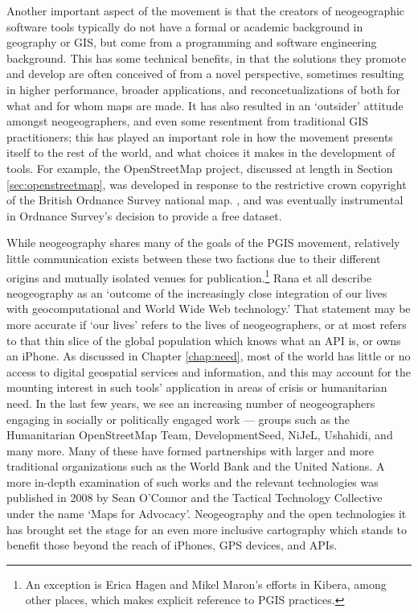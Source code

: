 \documentclass[11pt,oneside,notitlepage]{report}
\begin{document}
{{Another important aspect of the movement is that the creators of neogeographic software tools typically do not have a formal or academic background in geography or GIS, but come from a programming and software engineering background. This has some technical benefits, in that the solutions they promote and develop are often conceived of from a novel perspective, sometimes resulting in higher performance, broader applications, and reconcetualizations of both for what and for whom maps are made. It has also resulted in an `outsider' attitude amongst neogeographers, and even some resentment from traditional GIS practitioners; this has played an important role in how the movement presents itself to the rest of the world, and what choices it makes in the development of tools. For example, the OpenStreetMap project, discussed at length in Section \ref{sec:openstreetmap}, was developed in response to the restrictive crown copyright of the British Ordnance Survey national map. \cite{chilton-crowdsourcing}, and was eventually instrumental in Ordnance Survey's decision to provide a free dataset. \cite{arthur2010ord}

While neogeography shares many of the goals of the \ac{PGIS} movement, relatively little communication exists between these two factions due to their different origins and mutually isolated venues for publication.\footnote{An exception is Erica Hagen and Mikel Maron's efforts in Kibera, among other places, which makes explicit reference to \ac{PGIS} practices.} Rana et all describe neogeography as an `outcome of the increasingly close integration of our lives with geocomputational and World Wide Web technology.' That statement may be more accurate if `our lives' refers to the lives of neogeographers, or at most refers to that thin slice of the global population which knows what an \ac{API} is, or owns an iPhone. As discussed in Chapter \ref{chap:need}, most of the world has little or no access to digital geospatial services and information, and this may account for the mounting interest in such tools' application in areas of crisis or humanitarian need. In the last few years, we see an increasing number of neogeographers engaging in socially or politically engaged work --- groups such as the Humanitarian OpenStreetMap Team, DevelopmentSeed, NiJeL, Ushahidi, and many more. Many of these have formed partnerships with larger and more traditional organizations such as the World Bank and the United Nations. A more in-depth examination of such works and the relevant technologies was published in 2008 by Sean O'Connor and the Tactical Technology Collective under the name `Maps for Advocacy'. \cite{oconnor2008maps} Neogeography and the open technologies it has brought set the stage for an even more inclusive cartography which stands to benefit those beyond the reach of iPhones, GPS devices, and \ac{API}s.  

}}
\end{document}
